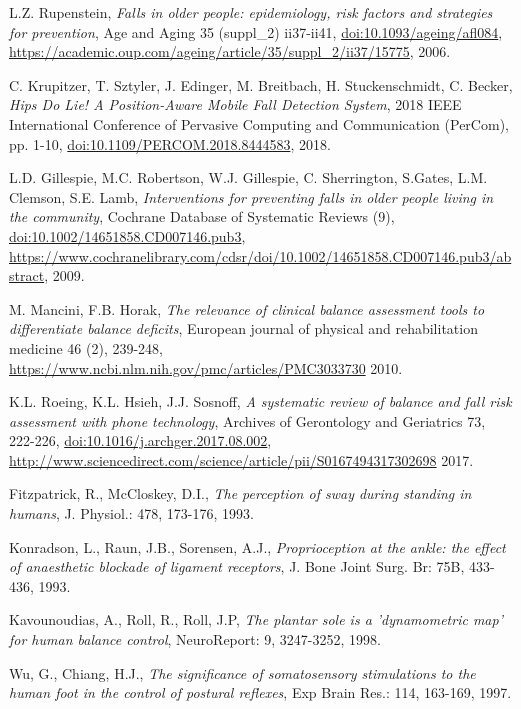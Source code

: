 \begin{thebibliography}{9}

L.Z. Rupenstein,
{\em Falls in older people: epidemiology, risk factors and strategies for prevention},
Age and Aging 35 (suppl\_2) ii37-ii41,
\url{doi:10.1093/ageing/afl084},
\url{https://academic.oup.com/ageing/article/35/suppl_2/ii37/15775},
2006.

C. Krupitzer, T. Sztyler, J. Edinger, M. Breitbach, H. Stuckenschmidt, C. Becker,
{\em Hips Do Lie! A Position-Aware Mobile Fall Detection System},
2018 IEEE International Conference of Pervasive Computing and Communication (PerCom),
pp. 1-10,
\url{doi:10.1109/PERCOM.2018.8444583},
2018.

L.D. Gillespie, M.C. Robertson, W.J. Gillespie, C. Sherrington, S.Gates, L.M. Clemson, S.E. Lamb,
{\em Interventions for preventing falls in older people living in the community},
Cochrane Database of Systematic Reviews (9),
\url{doi:10.1002/14651858.CD007146.pub3},
\url{https://www.cochranelibrary.com/cdsr/doi/10.1002/14651858.CD007146.pub3/abstract},
2009.

M. Mancini, F.B. Horak,
{\em The relevance of clinical balance assessment tools to differentiate balance deficits},
European journal of physical and rehabilitation medicine 46 (2),
239-248,
\url{https://www.ncbi.nlm.nih.gov/pmc/articles/PMC3033730}
2010.

K.L. Roeing, K.L. Hsieh, J.J. Sosnoff,
{\em A systematic review of balance and fall risk assessment with phone technology},
Archives of Gerontology and Geriatrics 73,
222-226,
\url{doi:10.1016/j.archger.2017.08.002},
\url{http://www.sciencedirect.com/science/article/pii/S0167494317302698}
2017.

Fitzpatrick, R., McCloskey, D.I.,
{\em The perception of sway during standing in humans},
J. Physiol.: 478, 173-176,
1993.

Konradson, L., Raun, J.B., Sorensen, A.J.,
{\em Proprioception at the ankle: the effect of anaesthetic blockade of ligament receptors},
J. Bone Joint Surg. Br: 75B, 433-436,
1993.

Kavounoudias, A., Roll, R., Roll, J.P,
{\em The plantar sole is a 'dynamometric map' for human balance control},
NeuroReport: 9, 3247-3252,
1998.

Wu, G., Chiang, H.J.,
{\em The significance of somatosensory stimulations to the human foot in the control of postural reflexes},
Exp Brain Res.: 114, 163-169,
1997.


\end{thebibliography}
